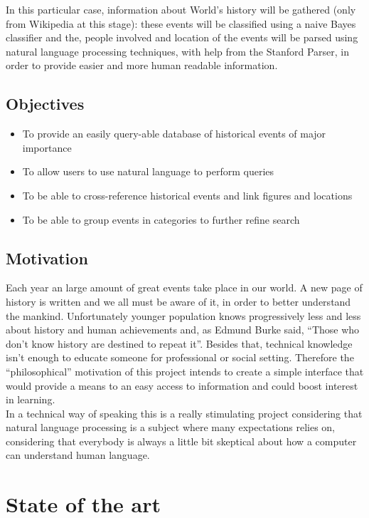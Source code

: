 \documentclass{llncs}
\begin{document}
In this particular case, information about World's history will be gathered (only from Wikipedia at this stage): these events will be classified using a naive Bayes classifier and the, people involved and location of the events will be parsed using natural language processing techniques, with help from the Stanford Parser, in order to provide easier and more human readable information.\\

\subsection{Objectives}

\begin{itemize}
	\item To provide an easily query-able database of historical events of major importance
	\item To allow users to use natural language to perform queries
	\item To be able to cross-reference historical events and link figures and locations
	\item To be able to group events in categories to further refine search
\end{itemize}

\subsection{Motivation}
Each year an large amount of great events take place in our world. A new page of history is written and we all must be aware of it, in order to better understand the mankind. Unfortunately younger population knows progressively less and less about history and human achievements and, as Edmund Burke said, ``Those who don't know history are destined to repeat it''. Besides that, technical knowledge isn't enough to educate someone for professional or social setting.
Therefore the ``philosophical'' motivation of this project intends to create a simple interface that would provide a means to an easy access to information and could boost interest in learning.\\

In a technical way of speaking this is a really stimulating project considering that natural language processing is a subject where many expectations relies on, considering that everybody is always a little bit skeptical about how a computer can understand human language.

\section{State of the art}
\end{document}
